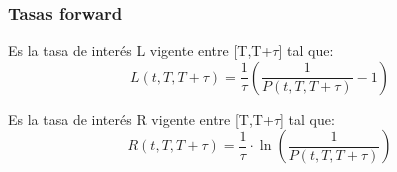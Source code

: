 
\begin{frame}
    \frametitle{Tasas forward}
    \begin{defin}
        Es la tasa de interés L vigente entre [T,T+$\tau$] tal que:
        \begin{equation*}
            L(t, T, T+\tau) = \frac{1}{\tau} \left( \frac{1}{P(t, T, T+\tau)} - 1\right)
        \end{equation*}
    \end{defin}
    \begin{defin}
        Es la tasa de interés R vigente entre [T,T+$\tau$] tal que:
        \begin{equation*}
            R(t, T, T+\tau) = \frac{1}{\tau} \cdot \ln\left(\frac{1}{P(t, T, T+\tau)}\right)
        \end{equation*}
    \end{defin}
\end{frame}

